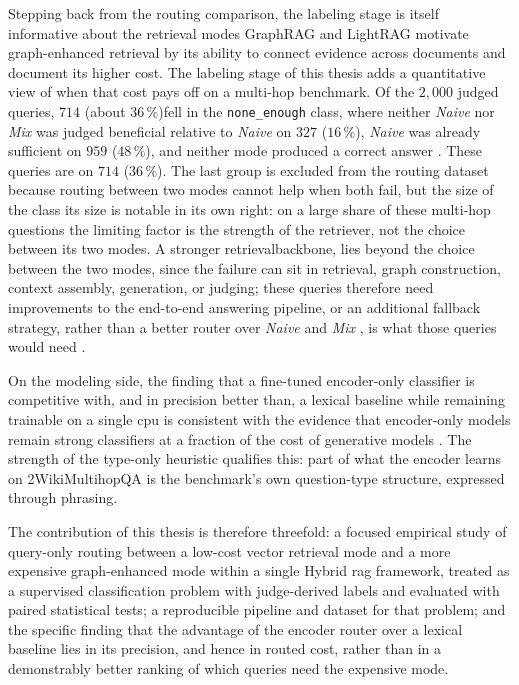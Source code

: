 \documentclass[english, bibtex]{kththesis}               %
\numberwithin{listing}{chapter}
\providecommand{\DIFaddtex}[1]{{\protect\color{blue} \sf #1}} %
\providecommand{\DIFdeltex}[1]{{\protect\color{red} \scriptsize #1}} %
\providecommand{\DIFaddbegin}{} %
\providecommand{\DIFaddend}{} %
\providecommand{\DIFdelbegin}{} %
\providecommand{\DIFdelend}{} %
\providecommand{\DIFadd}[1]{\texorpdfstring{\DIFaddtex{#1}}{#1}} %
\providecommand{\DIFdel}[1]{\texorpdfstring{\DIFdeltex{#1}}{}} %
\begin{document}
\DIFdelbegin \DIFdel{Stepping back from the routing comparison, the labeling stage is itself informative about the retrieval modes}\DIFdelend \DIFaddbegin \DIFadd{GraphRAG and LightRAG \cite{edge2024graphrag,lightrag2024} motivate graph-enhanced retrieval by its ability to connect evidence across documents and document its higher cost. The labeling stage of this thesis adds a quantitative view of when that cost pays off on a multi-hop benchmark}\DIFaddend . Of the $2{,}000$ judged queries, \DIFdelbegin \DIFdel{$714$ (about $36\,\%$)fell in the \texttt{none\_enough} class, where neither \emph{Naive} nor }\DIFdelend \emph{Mix} \DIFaddbegin \DIFadd{was judged beneficial relative to \emph{Naive} on $327$ ($16\,\%$), \emph{Naive} was already sufficient on $959$ ($48\,\%$), and neither mode }\DIFaddend produced a correct answer \DIFdelbegin \DIFdel{. These queries are }\DIFdelend \DIFaddbegin \DIFadd{on $714$ ($36\,\%$). The last group is }\DIFaddend excluded from the routing dataset because routing between two modes cannot help when both fail, but \DIFdelbegin \DIFdel{the size of the class }\DIFdelend \DIFaddbegin \DIFadd{its size }\DIFaddend is notable in its own right: on a large share of these multi-hop questions the limiting factor \DIFdelbegin \DIFdel{is the strength of the retriever, not the choice between its two modes. A stronger retrievalbackbone, }\DIFdelend \DIFaddbegin \DIFadd{lies beyond the choice between the two modes, since the failure can sit in retrieval, graph construction, context assembly, generation, or judging; these queries therefore need improvements to the end-to-end answering pipeline, or an additional fallback strategy, }\DIFaddend rather than a better router over \emph{Naive} and \emph{Mix}\DIFdelbegin \DIFdel{, is what those queries would need }\DIFdelend .

\DIFaddbegin \DIFadd{On the modeling side, the finding that a fine-tuned encoder-only classifier is competitive with, and in precision better than, a lexical baseline while remaining trainable on a single \gls{cpu} is consistent with the evidence that encoder-only models remain strong classifiers at a fraction of the cost of generative models \cite{benayas2024encoder,warner2024modernbert}. The strength of the type-only heuristic qualifies this: part of what the encoder learns on 2WikiMultihopQA is the benchmark's own question-type structure, expressed through phrasing.
}

\DIFadd{The contribution of this thesis is therefore threefold: a focused empirical study of query-only routing between a low-cost vector retrieval mode and a more expensive graph-enhanced mode within a single Hybrid \gls{rag} framework, treated as a supervised classification problem with judge-derived labels and evaluated with paired statistical tests; a reproducible pipeline and dataset for that problem; and the specific finding that the advantage of the encoder router over a lexical baseline lies in its precision, and hence in routed cost, rather than in a demonstrably better ranking of which queries need the expensive mode.
}
\end{document}
